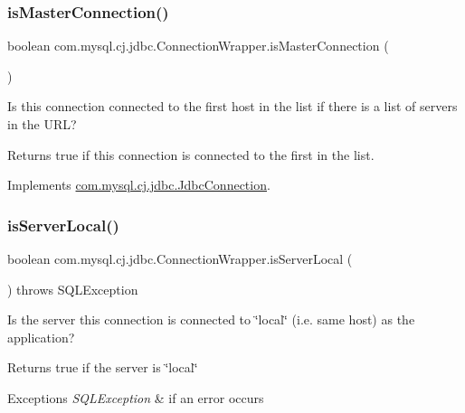 \subsubsection{\texorpdfstring{is\+Master\+Connection()}{isMasterConnection()}}
{\footnotesize\ttfamily boolean com.\+mysql.\+cj.\+jdbc.\+Connection\+Wrapper.\+is\+Master\+Connection (\begin{DoxyParamCaption}{ }\end{DoxyParamCaption})}

Is this connection connected to the first host in the list if there is a list of servers in the U\+RL?

\begin{DoxyReturn}{Returns}
true if this connection is connected to the first in the list. 
\end{DoxyReturn}


Implements \mbox{\hyperlink{interfacecom_1_1mysql_1_1cj_1_1jdbc_1_1_jdbc_connection_a012dc133872dd4d6db6d6f98118d3251}{com.\+mysql.\+cj.\+jdbc.\+Jdbc\+Connection}}.

\mbox{\label{classcom_1_1mysql_1_1cj_1_1jdbc_1_1_connection_wrapper_afe8fab04e181ccd81e0e5bb3881361cd}} 
\subsubsection{\texorpdfstring{is\+Server\+Local()}{isServerLocal()}}
{\footnotesize\ttfamily boolean com.\+mysql.\+cj.\+jdbc.\+Connection\+Wrapper.\+is\+Server\+Local (\begin{DoxyParamCaption}{ }\end{DoxyParamCaption}) throws S\+Q\+L\+Exception}

Is the server this connection is connected to \char`\"{}local\char`\"{} (i.\+e. same host) as the application?

\begin{DoxyReturn}{Returns}
true if the server is \char`\"{}local\char`\"{} 
\end{DoxyReturn}

\begin{DoxyExceptions}{Exceptions}
{\em S\+Q\+L\+Exception} & if an error occurs \\
\hline
\end{DoxyExceptions}


